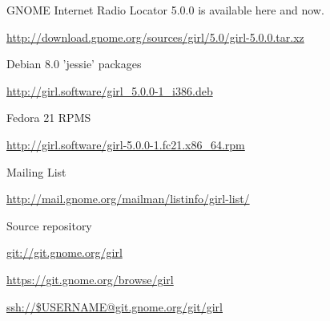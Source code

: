 \documentclass[20pt,landscape]{foils}
\begin{document}
\begin{list1}
\item GNOME Internet Radio Locator 5.0.0 is available here and now.
  \begin{list2}
  \item \url{http://download.gnome.org/sources/girl/5.0/girl-5.0.0.tar.xz}
  \end{list2}
\item Debian 8.0 'jessie' packages
  \begin{list2}
  \item \url{http://girl.software/girl_5.0.0-1_i386.deb}
  \end{list2}
\item Fedora 21 RPMS
  \begin{list2}
  \item \url{http://girl.software/girl-5.0.0-1.fc21.x86_64.rpm}
  \end{list2}
\item Mailing List    
  \begin{list2}
  \item \url{http://mail.gnome.org/mailman/listinfo/girl-list/}
  \end{list2}
\item Source repository
  \begin{list2}
    \item \url{git://git.gnome.org/girl}
    \item \url{https://git.gnome.org/browse/girl}
    \item \url{ssh://$USERNAME@git.gnome.org/git/girl}
  \end{list2}
\end{list1}
\end{document}
